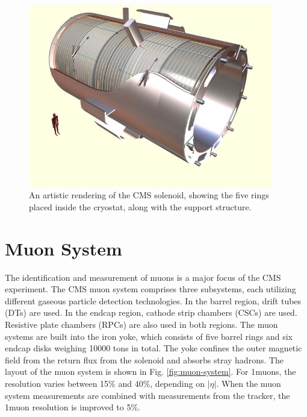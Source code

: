 \documentclass[12pt]{thesis}  %
\begin{document}
\begin{figure}[hbt]
\begin{center}
\includegraphics[width=0.95\textwidth]{figures/CMS_solenoid.jpg}
\caption{An artistic rendering of the CMS solenoid, showing the five rings placed inside the cryostat, along with the support structure.}
\label{fig:solenoid}
\end{center}
\end{figure}

\section{Muon System}
\label{sec:muon-system}

The identification and measurement of muons is a major focus of the CMS experiment. The CMS muon system comprises three subsystems, each utilizing different gaseous particle detection technologies. In the barrel region, drift tubes (DTs) are used. In the endcap region, cathode strip chambers (CSCs) are used. Resistive plate chambers (RPCs) are also used in both regions. The muon systems are built into the iron yoke, which consists of five barrel rings and six endcap disks weighing 10000 tons in total. The yoke confines the outer magnetic field from the return flux from the solenoid and absorbs stray hadrons. The layout of the muon system is shown in Fig. \ref{fig:muon-system}. For 1\TeV muons, the resolution varies between 15\% and 40\%, depending on $|\eta|$. When the muon system measurements are combined with measurements from the tracker, the 1\TeV muon resolution is improved to 5\%.
\end{document}
